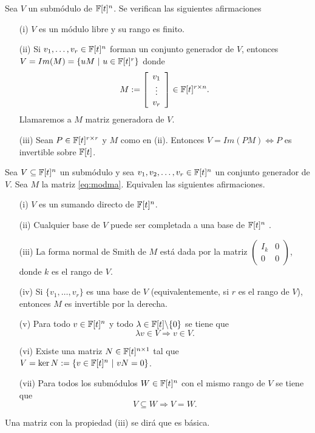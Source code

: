 \begin{proposicion}
Sea $V$ un submódulo de $\mathbb{F}[t]^n$. Se verifican las siguientes afirmaciones
\begin{itemize}
    \item[(i)] $V$ es un módulo libre y su rango es finito.
    \item[(ii)] Si $v_1,\dots,v_r \in \mathbb{F}[t]^n$ forman un conjunto generador de $V$, entonces $V =  Im(M) = \{uM \ | \ u \in \mathbb{F}[t]^r\}$ donde \begin{equation}\label{eq:modma} M := \left[ \begin{array}{c} v_1 \\ \vdots \\ v_r \end{array} \right]  \in \mathbb{F}[t]^{r \times n}. \end{equation} Llamaremos a $M$ matriz generadora de $V$.
    \item[(iii)] Sean $P \in  \mathbb{F}[t]^{r \times r}$ y $M$ como en (ii). Entonces $V = Im(PM) \Leftrightarrow P$ es invertible sobre $\mathbb{F}[t]$.
\end{itemize}
\end{proposicion}

\begin{proposicion} \label{prop:cc3}
Sea $V \subseteq \mathbb{F}[t]^n$ un submódulo y sea $v_1,v_2,\dots,v_r \in \mathbb{F}[t]^n$ un conjunto generador de $V$. Sea $M$ la matriz \eqref{eq:modma}. Equivalen las siguientes afirmaciones.
\begin{itemize}
    \item[(i)] $V$ es un sumando directo de $\mathbb{F}[t]^n$.
    \item[(ii)] Cualquier base de $V$ puede ser completada a una base de $\mathbb{F}[t]^n$ .
    \item[(iii)] La forma normal de Smith de $M$ está dada por la matriz $\left( \begin{array}{cc} I_k & 0 \\ 0 & 0 \end{array}\right)$, donde $k$ es el rango de $V$.
    \item[(iv)] Si $\{v_1,\dots,v_r\}$ es una base de $V$ (equivalentemente, si $r$ es el rango de $V$), entonces $M$ es invertible por la derecha.
    \item[(v)] Para todo $v \in \mathbb{F}[t]^n$ y todo $\lambda \in \mathbb{F}[t] \backslash \{0\}$ se tiene que \begin{equation}\label{eq:modu1} \lambda v \in V \Rightarrow v \in V.\end{equation}
    \item[(vi)] Existe una matriz $N \in \mathbb{F}[t]^{n \times 1}$ tal que $V = \ker N := \{v \in \mathbb{F}[t]^n \ | \ vN = 0\}$.
    \item[(vii)] Para todos los submódulos $W \in \mathbb{F}[t]^n$ con el mismo rango de $V$ se tiene que $$V \subseteq W \Rightarrow V = W.$$  
\end{itemize}

Una matriz con la propiedad (iii) se dirá que es básica.

\end{proposicion}

\endinput
